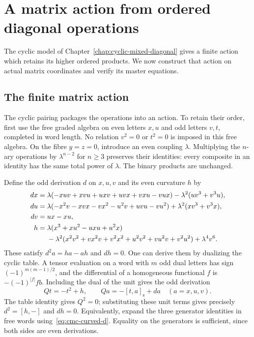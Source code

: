 \chapter{A matrix action from ordered diagonal operations}
\label{chap:cmc-matrix-action}

The cyclic model of Chapter~\ref{chap:cyclic-mixed-diagonal} gives a finite
action which retains its higher ordered products. We now construct that
action on actual matrix coordinates and verify its master equations.

\section{The finite matrix action}
\label{sec:cmc-hamiltonian}

The cyclic pairing packages the operations into an action.
To retain their order, first use the free graded algebra on
even letters \(x,u\) and odd letters \(v,t\), completed in word
length. No relation \(v^2=0\) or \(t^2=0\) is imposed in this
free algebra. On the fibre \(y=z=0\), introduce an even
coupling \(\lambda\). Multiplying the \(n\)-ary operations by
\(\lambda^{n-2}\) for \(n\ge3\) preserves their identities:
every composite in an identity has the same total power of
\(\lambda\). The binary products are unchanged.

Define the odd derivation \(d\) on \(x,u,v\) and its even
curvature \(h\) by
\begin{align}
 dx={}&\lambda(-xuv+xvu+uxv+uvx+vxu-vux)
          -\lambda^2(uv^3+v^3u),\notag\\
 du={}&\lambda(-x^2v-xvx-vx^2-u^2v+uvu-vu^2)
          +\lambda^2(xv^3+v^3x),\notag\\
 dv={}&ux-xu,\label{eq:cmc-curved-d}\\
 h={}&\lambda(x^3+xu^2-uxu+u^2x)\notag\\
 &-\lambda^2(x^2v^2+vx^2v+v^2x^2+
                  u^2v^2+vu^2v+v^2u^2)+\lambda^4v^6.
 \label{eq:cmc-curvature}
\end{align}
These satisfy \(d^2a=ha-ah\) and \(dh=0\).
One can derive them by dualizing the cyclic table. A tensor
evaluation on a word with \(m\) odd dual letters has sign
\((-1)^{m(m-1)/2}\), and the differential of a homogeneous
functional \(f\) is \(-(-1)^{|f|}f b\). Including the dual of
the unit gives the odd derivation
\[
 Qt=-t^2+h,\qquad
 Qa=-[t,a]_{\mathrm s}+da\quad(a=x,u,v).
\]
The table identity gives \(Q^2=0\); substituting these unit
terms gives precisely \(d^2=[h,-]\) and \(dh=0\).
Equivalently, expand the three generator identities in free
words using~\eqref{eq:cmc-curved-d}. Equality on the generators
is sufficient, since both sides are even derivations.

